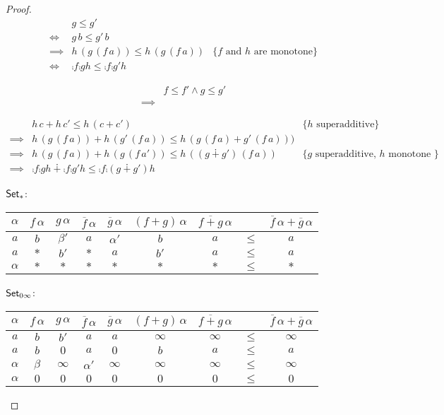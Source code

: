 \documentclass[runningheads,envcountsame]{llncs}
\begin{document}
\begin{proof}
    \begin{align}
             & g \leq g' \\
    \iff     & g\,b \leq g'\,b \\
    \implies & h\,(g\,(f\,a)) \leq  h\,(g\,(f\,a)) & \text{\{$f$ and $h$ are monotone\}} \\
    \iff     & \comp{f}{\comp{g}{h}} \leq \comp{f}{\comp{g'}{h}}
    \end{align}
    
    \begin{align}
        & f \leq f' \wedge g \leq g' \\
    \implies &
    \end{align}
    
    \begin{align}
             & h\,c + h\,c' \leq h\,(c + c') & \text{\{$h$ superadditive\}} \\
    \implies & h\,(g\,(f\,a)) + h\,(g'\,(f\,a)) \leq h\,(g\,(f\,a) + g'\,(f\,a))) \\
    \implies & h\,(g\,(f\,a)) + h\,(g\,(f\,a')) \leq h\,((g \dotplus g')\,(f\,a)) & \text{\{$g$ superadditive, $h$ monotone \}} \\
    \implies & \comp{f}{\comp{g}{h}} \dotplus \comp{f}{\comp{g'}{h}} \leq \comp{f}{\comp{(g \dotplus g')}{h}}
    \end{align}
    
    $\mathsf{Set}_*$:
    \begin{tabular}{c|c|c||c|c|c|c|c|c}
        $\alpha$ & $f\,\alpha$ & $g\,\alpha$ & $\overline{f}\,\alpha$ & $\overline{g}\,\alpha$ & $(f + g)\,\alpha$ & $\overline{f + g}\,\alpha$ & & $\overline{f}\,\alpha + \overline{g}\,\alpha$ \\
        \hline
        $a$ & $b$ & $\beta'$ & $a$ & $\alpha'$ & $b$ & $a$ & $\leq$ & $a$ \\ 
        $a$ & $*$ & $b'$ & $*$ & $a$ & $b'$ & $a$ & $\leq$ & $a$ \\ 
        $\alpha$ & $*$ & $*$ & $*$ & $*$ & $*$ & $*$ & $\leq$ & $*$ \\ 
    \end{tabular}
    
    $\mathsf{Set}_{0\infty}$:
    \begin{tabular}{c|c|c||c|c|c|c|c|c}
        $\alpha$ & $f\,\alpha$ & $g\,\alpha$ & $\overline{f}\,\alpha$ & $\overline{g}\,\alpha$ & $(f + g)\,\alpha$ & $\overline{f + g}\,\alpha$ & & $\overline{f}\,\alpha + \overline{g}\,\alpha$ \\
        \hline
        $a$ & $b$ & $b'$ & $a$ & $a$ & $\infty$ & $\infty$ & $\leq$ & $\infty$ \\ 
        $a$ & $b$ & $0$ & $a$ & $0$ & $b$ & $a$ & $\leq$ & $a$ \\  
        $\alpha$ & $\beta$ & $\infty$ & $\alpha'$ & $\infty$ & $\infty$ & $\infty$ & $\leq$ & $\infty$ \\
        $\alpha$ & $0$ & $0$ & $0$ & $0$ & $0$ & $0$ & $\leq$ & $0$ \\  
    \end{tabular}
    

\end{proof}
\end{document}
